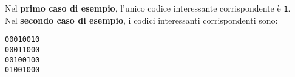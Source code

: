 

\Examples
\begin{example}
%
%
\end{example}


\Explanation
Nel \textbf{primo caso di esempio}, l'unico codice interessante corrispondente \`e \texttt{1}.\\[2mm]
Nel \textbf{secondo caso di esempio}, i codici interessanti corrispondenti sono:
\begin{center}
	\texttt{00010010\\
	00011000\\
	00100100\\
	01001000}
\end{center}
